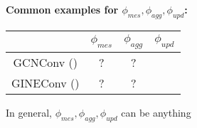 \textbf{Common examples for $\phi_{mes},\phi_{agg},\phi_{upd}$:}
\begin{center}
    \begin{tabular}{ c|ccc } 
        & $\phi_{mes}$ & $\phi_{agg}$ & $\phi_{upd}$\\ 
        \hline
        GCNConv (\cite{paperGCNConv}) & ? & ? \\ 
        GINEConv (\cite{paperGINEConv}) & ? & ? \\ 
    \end{tabular}
\end{center}

In general, $\phi_{mes},\phi_{agg},\phi_{upd}$ can be anything